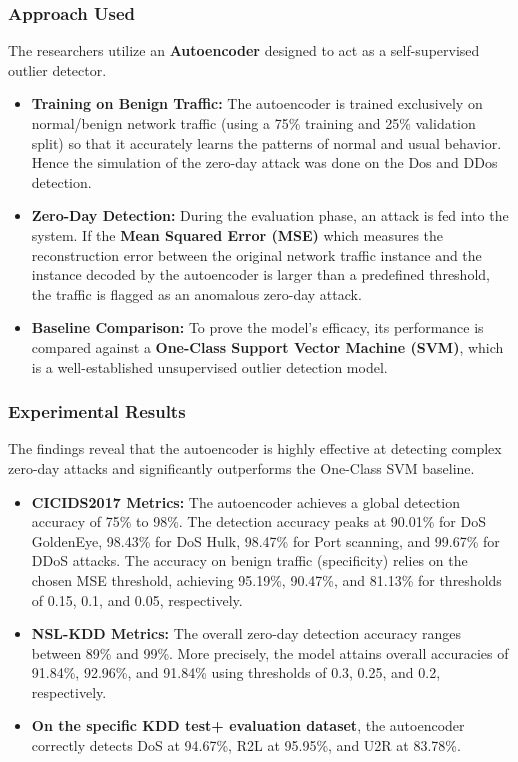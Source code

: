 \documentclass[12pt, a4paper]{report}
\begin{document}
\subsubsection{Approach Used}
The researchers utilize an \textbf{Autoencoder} designed to act as a self-supervised outlier detector.
\begin{itemize}
    \item \textbf{Training on Benign Traffic:} The autoencoder is trained exclusively on normal/benign network traffic (using a 75\% training and 25\% validation split) so that it accurately learns the patterns of normal and usual behavior. Hence the simulation of the zero-day attack was done on the Dos and DDos detection.
    \item \textbf{Zero-Day Detection:} During the evaluation phase, an attack is fed into the system. If the \textbf{Mean Squared Error (MSE)} which measures the reconstruction error between the original network traffic instance and the instance decoded by the autoencoder is larger than a predefined threshold, the traffic is flagged as an anomalous zero-day attack.
    \item \textbf{Baseline Comparison:} To prove the model's efficacy, its performance is compared against a \textbf{One-Class Support Vector Machine (SVM)}, which is a well-established unsupervised outlier detection model.
\end{itemize}

\subsubsection{Experimental Results}
The findings reveal that the autoencoder is highly effective at detecting complex zero-day attacks and significantly outperforms the One-Class SVM baseline.
\begin{itemize}
\item \textbf{CICIDS2017 Metrics:} The autoencoder achieves a global detection accuracy of 75\% to 98\%. The detection accuracy peaks at 90.01\% for DoS GoldenEye, 98.43\% for DoS Hulk, 98.47\% for Port scanning, and 99.67\% for DDoS attacks. The accuracy on benign traffic (specificity) relies on the chosen MSE threshold, achieving 95.19\%, 90.47\%, and 81.13\% for thresholds of 0.15, 0.1, and 0.05, respectively.
\item \textbf{NSL-KDD Metrics:} The overall zero-day detection accuracy ranges between 89\% and 99\%. More precisely, the model attains overall accuracies of 91.84\%, 92.96\%, and 91.84\% using thresholds of 0.3, 0.25, and 0.2, respectively.
\item \textbf{ On the specific KDD test+ evaluation dataset}, the autoencoder correctly detects DoS at 94.67\%, R2L at 95.95\%, and U2R at 83.78\%.
\end{itemize}
\end{document}
